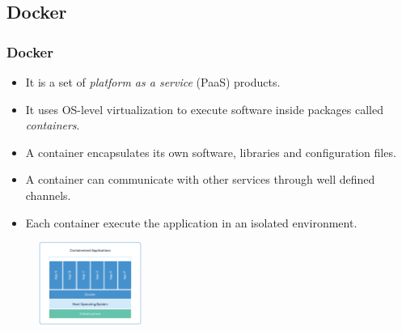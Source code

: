 \subsection{Docker}
\begin{frame}
    \frametitle{Docker}
    
    \begin{itemize}
        \item It is a set of \emph{platform as a service} (PaaS) products.
        \item It uses OS-level virtualization to execute software inside packages called \emph{containers}.
        \item A container encapsulates its own software, libraries and configuration files.
        \item A container can communicate with other services through well defined channels.
        \item Each container execute the application in an isolated environment.
    \end{itemize}
    
    \begin{figure}[h]
        \centering
        \includegraphics[width=0.3\textwidth]{./img/docker-containers.jpg}
    \end{figure}
\end{frame}

